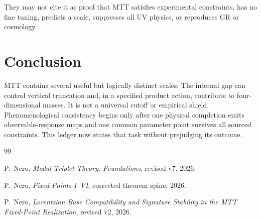 \documentclass[11pt]{article}
\begin{document}
They may not cite it as proof that MTT satisfies experimental constraints, has
no fine tuning, predicts a scale, suppresses all UV physics, or reproduces GR
or cosmology.

\section{Conclusion}

MTT contains several useful but logically distinct scales. The internal gap
can control vertical truncation and, in a specified product action, contribute
to four-dimensional masses. It is not a universal cutoff or empirical shield.
Phenomenological consistency begins only after one physical completion emits
observable-response maps and one common parameter point survives all sourced
constraints. This ledger now states that task without prejudging its outcome.

\begin{thebibliography}{99}

P.~Nero,
\newblock \emph{Modal Triplet Theory: Foundations}, revised v7, 2026.

P.~Nero,
\newblock \emph{Fixed Points I--VI}, corrected theorem spine, 2026.

P.~Nero,
\newblock \emph{Lorentzian Base Compatibility and Signature Stability in the
MTT Fixed-Point Realization}, revised v2, 2026.

\end{thebibliography}
\end{document}
